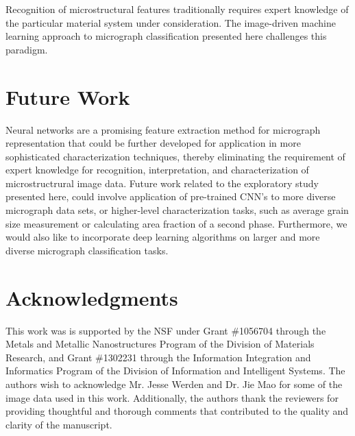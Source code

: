 %
Recognition of microstructural features traditionally requires expert knowledge of the particular material system under consideration.  The image-driven machine learning approach to micrograph classification presented here challenges this paradigm.  

\section{Future Work}
\label{future_work}

Neural networks are a promising feature extraction method for micrograph representation that could be further developed for application in more sophisticated characterization techniques, thereby eliminating the requirement of expert knowledge for recognition, interpretation, and characterization of microstructrural image data.  
%
Future work related to the exploratory study presented here, could involve application of pre-trained CNN's to more diverse micrograph data sets, or higher-level characterization tasks, such as average grain size measurement or calculating area fraction of a second phase.  
Furthermore, we would also like to incorporate deep learning algorithms on larger and more diverse micrograph classification tasks.
\section*{Acknowledgments}
\label{acknowledgments}
This work was is supported by the NSF under Grant \#1056704 through the Metals and Metallic Nanostructures Program of the Division of Materials Research, and Grant \#1302231 through the Information Integration and Informatics Program of the Division of Information and Intelligent Systems.   
%
The authors wish to acknowledge Mr. Jesse Werden and Dr. Jie Mao for some of the image data used in this work. 
%
Additionally, the authors thank the reviewers for providing thoughtful and thorough comments that contributed to the quality and clarity of the manuscript. 
